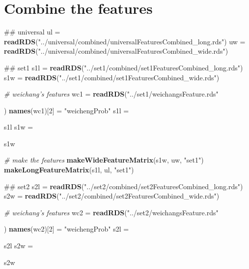 \documentclass[10pt]{report}
\newenvironment{Shaded}{}{}
\newcommand{\KeywordTok}[1]{\textcolor[rgb]{0.00,0.44,0.13}{\textbf{{#1}}}}
\newcommand{\DataTypeTok}[1]{\textcolor[rgb]{0.56,0.13,0.00}{{#1}}}
\newcommand{\DecValTok}[1]{\textcolor[rgb]{0.25,0.63,0.44}{{#1}}}
\newcommand{\StringTok}[1]{\textcolor[rgb]{0.25,0.44,0.63}{{#1}}}
\newcommand{\CommentTok}[1]{\textcolor[rgb]{0.38,0.63,0.69}{\textit{{#1}}}}
\newcommand{\NormalTok}[1]{{#1}}
\begin{document}
\section{Combine the features}\label{combine-the-features}

\begin{Shaded}
\begin{Highlighting}[]
\NormalTok{## universal}
\NormalTok{ul =}\StringTok{ }\KeywordTok{readRDS}\NormalTok{(}\StringTok{"../universal/combined/universalFeaturesCombined_long.rds"}\NormalTok{)}
\NormalTok{uw =}\StringTok{ }\KeywordTok{readRDS}\NormalTok{(}\StringTok{"../universal/combined/universalFeaturesCombined_wide.rds"}\NormalTok{)}

\NormalTok{## set1}
\NormalTok{s1l =}\StringTok{ }\KeywordTok{readRDS}\NormalTok{(}\StringTok{"../set1/combined/set1FeaturesCombined_long.rds"}\NormalTok{)}
\NormalTok{s1w =}\StringTok{ }\KeywordTok{readRDS}\NormalTok{(}\StringTok{"../set1/combined/set1FeaturesCombined_wide.rds"}\NormalTok{)}

\CommentTok{# weichang's features}
\NormalTok{wc1 =}\StringTok{ }\KeywordTok{readRDS}\NormalTok{(}\StringTok{"../set1/weichangsFeature.rds"}\NormalTok{) %>%}\StringTok{ }\KeywordTok{select}\NormalTok{(-userID)}
\KeywordTok{names}\NormalTok{(wc1)[}\DecValTok{2}\NormalTok{] =}\StringTok{ "weichengProb"}
\NormalTok{s1l =}\StringTok{ }\NormalTok{s1l %>%}\StringTok{ }\KeywordTok{left_join}\NormalTok{(wc1, }\DataTypeTok{by =} \StringTok{"orderID"}\NormalTok{)}
\NormalTok{s1w =}\StringTok{ }\NormalTok{s1w %>%}\StringTok{ }\KeywordTok{left_join}\NormalTok{(wc1, }\DataTypeTok{by =} \StringTok{"orderID"}\NormalTok{)}

\CommentTok{# make the features}
\KeywordTok{makeWideFeatureMatrix}\NormalTok{(s1w, uw, }\StringTok{"set1"}\NormalTok{)}
\KeywordTok{makeLongFeatureMatrix}\NormalTok{(s1l, ul, }\StringTok{"set1"}\NormalTok{)}

\NormalTok{## set2}
\NormalTok{s2l =}\StringTok{ }\KeywordTok{readRDS}\NormalTok{(}\StringTok{"../set2/combined/set2FeaturesCombined_long.rds"}\NormalTok{)}
\NormalTok{s2w =}\StringTok{ }\KeywordTok{readRDS}\NormalTok{(}\StringTok{"../set2/combined/set2FeaturesCombined_wide.rds"}\NormalTok{)}

\CommentTok{# weichang's features}
\NormalTok{wc2 =}\StringTok{ }\KeywordTok{readRDS}\NormalTok{(}\StringTok{"../set2/weichangsFeature.rds"}\NormalTok{) %>%}\StringTok{ }\KeywordTok{select}\NormalTok{(-userID)}
\KeywordTok{names}\NormalTok{(wc2)[}\DecValTok{2}\NormalTok{] =}\StringTok{ "weichengProb"}
\NormalTok{s2l =}\StringTok{ }\NormalTok{s2l %>%}\StringTok{ }\KeywordTok{left_join}\NormalTok{(wc2, }\DataTypeTok{by =} \StringTok{"orderID"}\NormalTok{)}
\NormalTok{s2w =}\StringTok{ }\NormalTok{s2w %>%}\StringTok{ }\KeywordTok{left_join}\NormalTok{(wc2, }\DataTypeTok{by =} \StringTok{"orderID"}\NormalTok{)}

}}}}}}
\end{Highlighting}
\end{Shaded}
\end{document}
